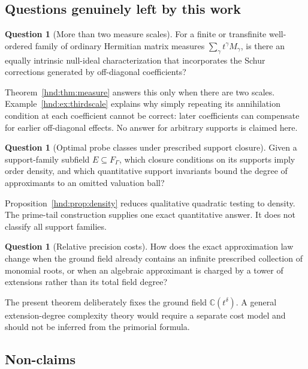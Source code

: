 \documentclass[11pt,oneside]{article}
\theoremstyle{definition}
\newtheorem{question}[theorem]{Question}
\theoremstyle{remark}
\newcommand{\C}{\mathbb C}
\begin{document}
\subsection{Questions genuinely left by this work}

\begin{question}[More than two measure scales]\label{hnd:q:morescales}
For a finite or transfinite well-ordered family of ordinary Hermitian
matrix measures $\sum_\gamma t^\gamma M_\gamma$, is there an equally
intrinsic null-ideal characterization that incorporates the Schur
corrections generated by off-diagonal coefficients?
\end{question}

Theorem~\ref{hnd:thm:measure} answers this only when there are two scales.
Example~\ref{hnd:ex:thirdscale} explains why simply repeating its
annihilation condition at each coefficient cannot be correct: later
coefficients can compensate for earlier off-diagonal effects.
No answer for arbitrary supports is claimed here.

\begin{question}[Optimal probe classes under prescribed support closure]
Given a support-family subfield $E\subseteq F_\Gamma$, which closure
conditions on its supports imply order density, and which quantitative
support invariants bound the degree of approximants to an omitted
valuation ball?
\end{question}

Proposition~\ref{hnd:prop:density} reduces qualitative quadratic testing to
density. The prime-tail construction supplies one exact quantitative
answer. It does not classify all support families.

\begin{question}[Relative precision costs]
How does the exact approximation law change when the ground field
already contains an infinite prescribed collection of monomial roots,
or when an algebraic approximant is charged by a tower of extensions
rather than its total field degree?
\end{question}

The present theorem deliberately fixes the ground field $\C(t^\delta)$.
A general extension-degree complexity theory would require a separate
cost model and should not be inferred from the primorial formula.

\subsection{Non-claims}\label{hnd:sec:nonclaims}
\end{document}
